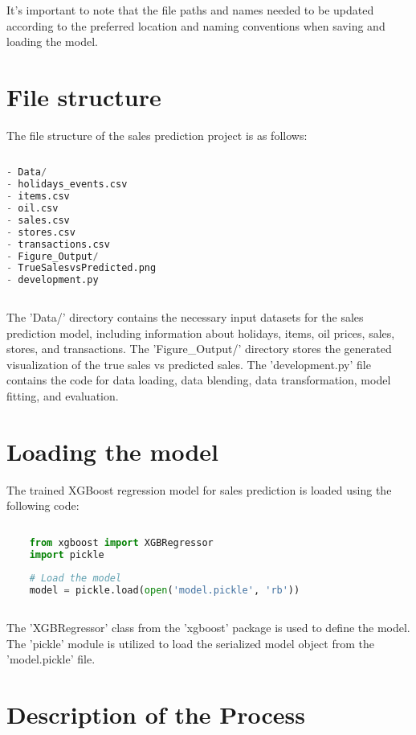 It's important to note that the file paths and names needed to be updated according to the preferred location and naming conventions when saving and loading the model.




\section{File structure}

The file structure of the sales prediction project is as follows:

\begin{lstlisting}[language=Python]
	
- Data/
- holidays_events.csv
- items.csv
- oil.csv
- sales.csv
- stores.csv
- transactions.csv
- Figure_Output/
- TrueSalesvsPredicted.png
- development.py
	
\end{lstlisting}

The 'Data/' directory contains the necessary input datasets for the sales prediction model, including information about holidays, items, oil prices, sales, stores, and transactions. The 'Figure\_Output/' directory stores the generated visualization of the true sales vs predicted sales. The 'development.py' file contains the code for data loading, data blending, data transformation, model fitting, and evaluation.

\section{Loading the model}

The trained XGBoost regression model for sales prediction is loaded using the following code:

\begin{lstlisting}[language=Python]
	
	from xgboost import XGBRegressor
	import pickle
	
	# Load the model
	model = pickle.load(open('model.pickle', 'rb'))
		
\end{lstlisting}

The 'XGBRegressor' class from the 'xgboost' package is used to define the model. The 'pickle' module is utilized to load the serialized model object from the 'model.pickle' file.

\section{Description of the Process}


